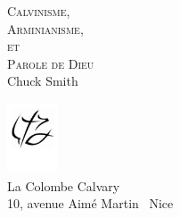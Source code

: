 
\newcommand{\HRule}{\rule{\linewidth}{0.2mm}}

\begin{titlepage}
\begin{center}
\mbox{}
\vfill
\textsc{ \Huge Calvinisme,\\[0.4cm] Arminianisme,\\[0.4cm] et\\[0.4cm] Parole de Dieu}\\[0.4cm]

{\LARGE Chuck Smith}\\[1.5cm]
\vfill

\includegraphics[width=4em]{revival_potrace} \\[-5mm]
\logofont\large La Colombe Calvary \\
\normalfont\normalsize 10, avenue Aimé Martin ~Nice\\

\end{center}
\end{titlepage}

